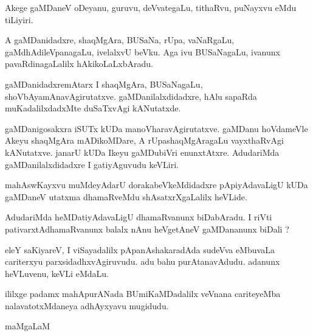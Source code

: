 \documentclass{article}
\begin{document}
\begin{mn}
Akege gaMDaneV oDeyanu, guruvu, deVvategaLu, tithaRvu, puNayxvu eMdu tiLiyiri.
\end{mn}

\begin{mn}
A gaMDanidadxre, shaqMgAra, BUSaNa, rUpa, vaNaRgaLu,  gaMdhAdileVpanagaLu, 
ivelalxvU beVku.  Aga ivu BUSaNagaLu, ivanunx pavaRdinagaLalilx hAkikoLaLxbAradu.
\end{mn}

\begin{mn}
gaMDanidadxremAtarx I shaqMgAra, BUSaNagaLu, shoVbAyamAnavAgirutatxve.  gaMDanilalxdidadxre,  
hAlu  sapaRda  muKadalilxdadxMte duSaTxvAgi kANutatxde.
\end{mn}

\begin{mn}
gaMDanigosakxra  iSUTx  kUDa  manoVharavAgirutatxve. gaMDanu hoVdameVle Akeyu shaqMgAra 
mADikoMDare, A rUpashaqMgAragaLu vayxthaRvAgi kANutatxve.  janarU  kUDa Ikeyu gaMDubiVri 
enunxtAtxre. AdudariMda gaMDanilalxdidadxre  I gatiyAguvudu keVLiri.
\end{mn}

\begin{mn}
mahAswKayxvu  muMdeyAdarU  dorakabeVkeMdidadxre  pApiyAdavaLigU kUDa gaMDaneV 
utatxma dhamaRveMdu shAsatxrXgaLalilx heVLide.
\end{mn}

\begin{mn}
AdudariMda  heMDatiyAdavaLigU dhamaRvanunx biDabAradu. I riVti pativarxtAdhamaRvanunx 
balalx nAnu  heVgetAneV gaMDananunx biDali ?
\end{mn}

\begin{mn}
eleY saKiyareV, I viSayadalilx pApanAshakaradAda  sudeVva eMbuvaLa cariterxyu 
parxsidadhxvAgiruvudu.  adu  bahu purAtanavAdudu.  adanunx heVLuvenu,  keVLi eMdaLu.
\end{mn}

\begin{mn}
ililxge padamx mahApurANada BUmiKaMDadalilx veVnana cariteyeMba nalavatotxMdaneya adhAyxyavu mugidudu.
\end{mn}

\begin{mn}         
                                                 maMgaLaM   
\end{mn}


\begin{mn}   
\end{mn}
\end{document}
